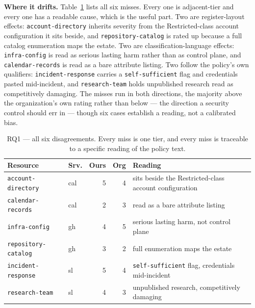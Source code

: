 \textbf{Where it drifts.} Table~\ref{tab:misses} lists all six misses. Every one
is adjacent-tier and every one has a readable cause, which is the useful part.
Two are register-layout effects: \texttt{account-directory} inherits severity
from the Restricted-class account configuration it sits beside, and
\texttt{repository-catalog} is rated up because a full catalog enumeration maps
the estate. Two are classification-language effects: \texttt{infra-config} is
read as serious lasting harm rather than as control plane, and
\texttt{calendar-records} is read as a bare attribute listing. Two follow the
policy's own qualifiers: \texttt{incident-response} carries a
\texttt{self-sufficient} flag and credentials pasted mid-incident, and
\texttt{research-team} holds unpublished research read as competitively
damaging.
The misses run in both directions, the majority above the organization's own
rating rather than below --- the direction a security control should err in ---
though six cases establish a reading, not a calibrated bias.

\begin{table}[t]
  \centering
  \footnotesize
  \caption{RQ1 --- all six disagreements. Every miss is one tier, and every miss
    is traceable to a specific reading of the policy text.}
  \label{tab:misses}
  \begin{tabular}{@{}llrrp{2.6cm}@{}}
    \toprule
    Resource & Srv. & Ours & Org & Reading \tabularnewline
    \midrule
    \texttt{account-directory} & cal & 5 & 4 & \raggedright sits beside the Restricted-class account configuration \tabularnewline
    \texttt{calendar-records}  & cal & 2 & 3 & \raggedright read as a bare attribute listing \tabularnewline
    \texttt{infra-config}      & gh  & 4 & 5 & \raggedright serious lasting harm, not control plane \tabularnewline
    \texttt{repository-catalog}& gh  & 3 & 2 & \raggedright full enumeration maps the estate \tabularnewline
    \texttt{incident-response} & sl  & 5 & 4 & \raggedright \texttt{self-sufficient} flag, credentials mid-incident \tabularnewline
    \texttt{research-team}     & sl  & 4 & 3 & \raggedright unpublished research, competitively damaging \tabularnewline
    \bottomrule
  \end{tabular}
\end{table}

